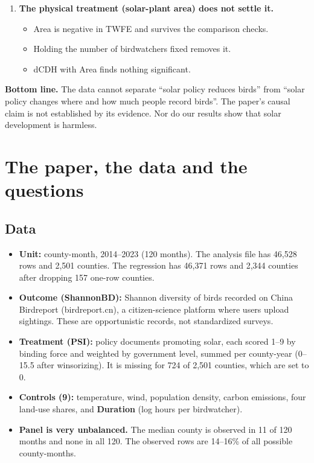 \documentclass[11pt]{article}
\begin{document}
\begin{answerbox}
\begin{enumerate}[leftmargin=16pt,itemsep=2pt,topsep=2pt]
\begin{itemize}[leftmargin=12pt,itemsep=1pt]
\item That negative effect weakens or becomes insignificant once the paper's controls are included and the sample is restricted to counties with real PSI or to within-urban/rural comparisons.
\item Its effort pre-trend tests fail.
\end{itemize}
\item \textbf{The physical treatment (solar-plant area) does not settle it.}
\begin{itemize}[leftmargin=12pt,itemsep=1pt]
\item Area is negative in TWFE and survives the comparison checks.
\item Holding the number of birdwatchers fixed removes it.
\item dCDH with Area finds nothing significant.
\end{itemize}
\end{enumerate}
\textbf{Bottom line.} The data cannot separate ``solar policy reduces birds'' from ``solar policy changes where and how much people record birds''. The paper's causal claim is not established by its evidence. Nor do our results show that solar development is harmless.
\end{answerbox}

\section{The paper, the data and the questions}
\subsection{Data}
\begin{itemize}[leftmargin=14pt,itemsep=2pt]
\item \textbf{Unit:} county-month, 2014--2023 (120 months). The analysis file has 46,528 rows and 2,501 counties. The regression has 46,371 rows and 2,344 counties after dropping 157 one-row counties.
\item \textbf{Outcome (ShannonBD):} Shannon diversity of birds recorded on China Birdreport (birdreport.cn), a citizen-science platform where users upload sightings. These are opportunistic records, not standardized surveys.
\item \textbf{Treatment (PSI):} policy documents promoting solar, each scored 1--9 by binding force and weighted by government level, summed per county-year (0--15.5 after winsorizing). It is missing for 724 of 2,501 counties, which are set to 0.
\item \textbf{Controls (9):} temperature, wind, population density, carbon emissions, four land-use shares, and \textbf{Duration} (log hours per birdwatcher).
\item \textbf{Panel is very unbalanced.} The median county is observed in 11 of 120 months and none in all 120. The observed rows are 14--16\% of all possible county-months.
\end{itemize}
\end{document}
